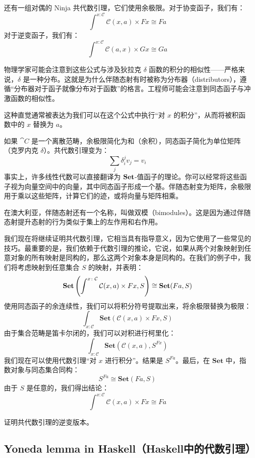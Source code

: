 \documentclass[DaoFP]{subfiles}
\begin{document}
 还有一组对偶的 Ninja 共代数引理，它们使用余极限。对于协变函子，我们有：
 \[ \int^{x \colon \mathcal{C}} \mathcal{C}(x, a) \times F x \cong F a \]
 对于逆变函子，我们有：
 \[ \int^{x \colon \mathcal{C}} \mathcal{C}(a, x) \times G x \cong G a \]

 物理学家可能会注意到这些公式与涉及狄拉克 $\delta$ 函数的积分的相似性——严格来说，$\delta$ 是一种分布。这就是为什么伴随态射有时被称为分布器（distributors），遵循“分布器对于函子就像分布对于函数”的格言。工程师可能会注意到同态函子与冲激函数的相似性。

 这种直觉通常被表达为我们可以在这个公式中执行“对 $x$ 的积分”，从而将被积函数中的 $x$ 替换为 $a$。

 如果 $\cat C$ 是一个离散范畴，余极限简化为和（余积），同态函子简化为单位矩阵（克罗内克 $\delta$）。共代数引理变为：
 \[ \sum_j \delta_i^j v_j = v_i \]
 事实上，许多线性代数可以直接翻译为 $\mathbf{Set}$-值函子的理论。你可以经常将这些函子视为向量空间中的向量，其中同态函子形成一个基。伴随态射变为矩阵，余极限用于乘以这些矩阵，计算它们的迹，或将向量与矩阵相乘。

 在澳大利亚，伴随态射还有一个名称，叫做双模（bimodules）。这是因为通过伴随态射提升态射的行为类似于集上的左作用和右作用。

 我们现在将继续证明共代数引理，它相当具有指导意义，因为它使用了一些常见的技巧。最重要的是，我们依赖于代数引理的推论，它说，如果从两个对象映射到任意对象的所有映射是同构的，那么这两个对象本身是同构的。在我们的例子中，我们将考虑映射到任意集合 $S$ 的映射，并表明：
 \[ \mathbf{Set} \left(\int^{x \colon \mathcal{C}} \mathcal{C}(x, a) \times F x, S \right) \cong
 \mathbf{Set} (F a, S)\]
 使用同态函子的余连续性，我们可以将积分符号提取出来，将余极限替换为极限：
 \[ \int_{x \colon \mathcal{C}} \mathbf{Set} \left( \mathcal{C}(x, a) \times F x, S \right) \]
 由于集合范畴是笛卡尔闭的，我们可以对积进行柯里化：
 \[ \int_{x \colon \mathcal{C}} \mathbf{Set} \left( \mathcal{C}(x, a) , S^{F x} \right) \]
 我们现在可以使用代数引理“对 $x$ 进行积分”。结果是 $S^{F a}$。最后，在 $\mathbf{Set}$ 中，指数对象与同态集合同构：
 \[S^{F a} \cong \mathbf{Set}(F a, S)\]
 由于 $S$ 是任意的，我们得出结论：
 \[ \int^{x \colon \mathcal{C}} \mathcal{C}(x, a) \times F x \cong F a \]

 \begin{exercise}
  证明共代数引理的逆变版本。
 \end{exercise}

 \subsection{Yoneda lemma in Haskell（Haskell中的代数引理）}
\end{document}
